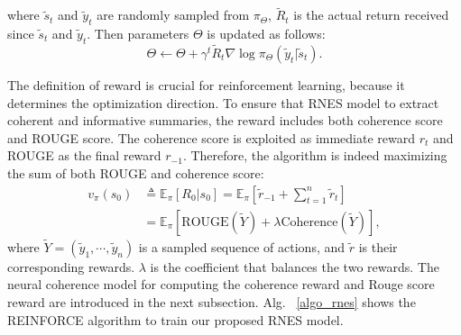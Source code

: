 \documentclass[letterpaper]{article} %
\begin{document}
	where $\tilde{s}_t$ and $\tilde{y}_t$ are randomly sampled from $\pi_{\Theta}$, $\tilde{R}_t$ is the actual return received since $\tilde{s}_t$ and $\tilde{y}_t$. Then parameters $\Theta$ is updated as follows:
	\begin{equation} \label{eq:update}
	\Theta \leftarrow \Theta + \gamma^t \tilde{R}_t \nabla \log \pi_{\Theta}(\tilde{y}_t|\tilde{s}_t) .
	\end{equation} 
	
	The definition of reward is crucial for reinforcement learning, because it determines the optimization direction. To ensure that RNES model to extract coherent and informative summaries, the reward includes both coherence score and ROUGE score. The coherence score is exploited as immediate reward $r_t$ and ROUGE as the final reward $r_{-1}$. Therefore, the algorithm is indeed maximizing the sum of both ROUGE and coherence score:
	\begin{align}
	v_{\pi}(s_0) &\triangleq \mathbb{E}_{\pi}[R_0 |s_0] = \mathbb{E}_{\pi} [ \tilde{r}_{-1} + \sum_{t=1}^{n} \tilde{r}_t ] \\
	&= \mathbb{E}_{\pi} [ \text{ROUGE}(\tilde{Y}) + \lambda \text{Coherence}(\tilde{Y}) ] , \label{eq:reward_sum}
	\end{align}
	where $\tilde{Y} = (\tilde{y}_1, \cdots, \tilde{y}_n)$ is a sampled sequence of actions, and $\tilde{r}$ is their corresponding rewards. $\lambda$ is the coefficient that balances the two rewards. The neural coherence model for computing the coherence reward and Rouge score reward are introduced in the next subsection. Alg. ~\ref{algo_rnes} shows the REINFORCE algorithm to train our proposed RNES model.  
	
\end{document}
